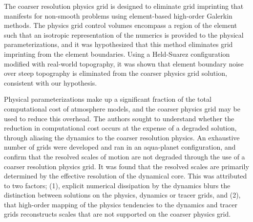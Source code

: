 \documentclass{agujournal}
\begin{document}
The coarser resolution physics grid is designed to eliminate grid imprinting that manifests for non-smooth problems using element-based high-order Galerkin methods. The physics grid control volumes encompass a region of the element such that an isotropic representation of the numerics is provided to the physical parameterizations, and it was hypothesized that this method eliminates grid imprinting from the element boundaries. Using a Held-Suarez configuration modified with real-world topography, it was shown that element boundary noise over steep topography is eliminated from the coarser physics grid solution, consistent with our hypothesis.

Physical parameterizations make up a significant fraction of the total computational cost of atmosphere models, and the coarser physics grid may be used to reduce this overhead. The authors sought to understand whether the reduction in computational cost occurs at the expense of a degraded solution, through aliasing the dynamics to the coarser resolution physics. An exhaustive number of grids were developed and ran in an aqua-planet configuration, and confirm that the resolved scales of motion are not degraded through the use of a coarser resolution physics grid. It was found that the resolved scales are primarily determined by the effective resolution of the dynamical core. This was attributed to two factors; (1), explicit numerical dissipation by the dynamics blurs the distinction between solutions on the physics, dynamics or tracer grids, and (2), that high-order mapping of the physics tendencies to the dynamics and tracer grids reconstructs scales that are not supported on the coarser physics grid.

\end{document}
